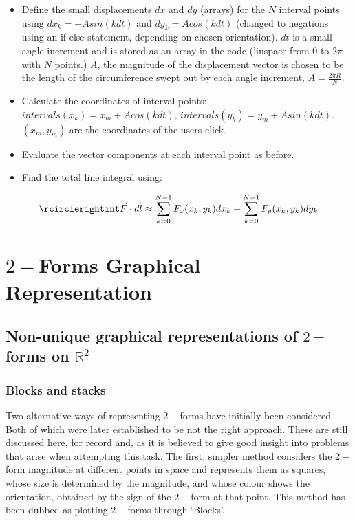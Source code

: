 \documentclass[12pt]{report}
\begin{document}
\begin{itemize}
	\item Define the small displacements $dx$ and $dy$ (arrays) for the $N$ interval points using $dx_k = -Asin(kdt)$ and $dy_k = Acos(kdt)$ (changed to negations using an if-else statement, depending on chosen orientation). $dt$ is a small angle increment and is stored as an array in the code (linspace from 0 to 2$\pi$ with $N$ points.) $A$, the magnitude of the displacement vector is chosen to be the length of the circumference swept out by each angle increment, $A = \frac{2\pi R}{N}$. 
	\item Calculate the coordinates of interval points: $intervals(x_k) = x_m + Acos(kdt)$, $intervals(y_k) = y_m + Asin(kdt)$. $(x_m,y_m)$ are the coordinates of the users click. 
	\item Evaluate the vector components at each interval point as before.
	\item Find the total line integral using:
\end{itemize}

\begin{equation}
	\rcirclerightint \vec{F} \cdot \vec{dl} \approx \sum_{k=0}^{N-1} F_x(x_k,y_k)dx_k + \sum_{k=0}^{N-1} F_y(x_k,y_k)dy_k
\end{equation}


\chapter{$2-$Forms Graphical Representation}

\section{Non-unique graphical representations of $2-$forms on $\mathbb{R}^{2}$}
\subsection{Blocks and stacks}
Two alternative ways of representing $2-$forms have initially been considered. Both of which were later established to be not the right approach. These are still discussed here, for record and, as it is believed to give good insight into problems that arise when attempting this task. 
The first, simpler method considers the $2-$form magnitude at different points in space and represents them as squares, whose size is determined by the magnitude, and whose colour shows the orientation, obtained by the sign of the $2-$form at that point. This method has been dubbed as plotting $2-$forms through `Blocks'.
\end{document}
